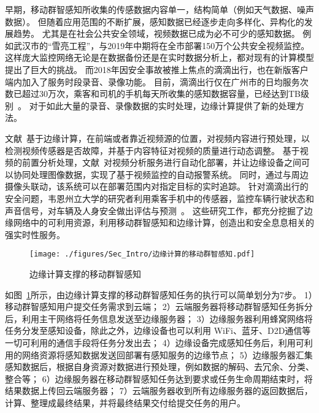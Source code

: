 

早期，移动群智感知所收集的传感数据内容单一，结构简单（例如天气数据、噪声数据）。
但随着应用范围的不断扩展，感知数据已经逐步走向多样化、异构化的发展趋势。
尤其是在社会公共安全领域，视频数据已成为必不可少的感知数据。
例如武汉市的“雪亮工程”，与2019年中期将在全市部署150万个公共安全视频监控。
这样庞大监控网络无论是在数据备份还是在实时数据分析上，都对现有的计算模型提出了巨大的挑战。
而2018年因安全事故被推上焦点的滴滴出行，也在新版客户端内加入了服务时段录音、录像功能。
目前，滴滴出行仅在广州市的日均服务次数已超过30万次，乘客和司机的手机每天所收集的感知数据容量，已经达到TB级别~\cite{DBLP:conf/aaai/Yao0KTJLGYL18}。
对于如此大量的录音、录像数据的实时处理，边缘计算提供了新的处理方法。

文献~\cite{DBLP:conf/edge/SunLS17}基于边缘计算，在前端或者靠近视频源的位置，对视频内容进行预处理，以检测视频传感器是否故障，并基于内容特征对视频的质量进行动态调整。
基于视频的前置分析处理，文献~\cite{DBLP:journals/iotj/ZhangZSZ18}对视频分析服务进行自动化部署，并让边缘设备之间可以协同处理图像数据，实现了基于视频监控的自动报警系统。
同时，通过与周边摄像头联动，该系统可以在部署范围内对指定目标的实时追踪。
针对滴滴出行的安全问题，韦恩州立大学的研究者利用乘客手机中的传感器，监控车辆行驶状态和声音信号，对车辆及人身安全做出评估与预测~\cite{DBLP:conf/edge/LiuZQS18}。
这些研究工作，都充分挖掘了边缘网络中的可利用资源，利用移动群智感知和边缘计算，创造出和安全息息相关的强实时性服务。

\begin{figure}[!b]
  \centering
  \vspace{-1em}
  \texttt{[image: ./figures/Sec\_Intro/边缘计算的移动群智感知.pdf]}
  \vspace{-0.5em}
  \caption{边缘计算支撑的移动群智感知}
  \vspace{-1em}
  \label{Figure_MCS_with_EC}
\end{figure}

如图~\ref{Figure_MCS_with_EC}所示，由边缘计算支撑的移动群智感知任务的执行可以简单划分为7步。
1）移动群智感知用户提交任务需求到云端；
2）云端服务器将移动群智感知任务拆分后，利用主干网络将任务信息发送至边缘服务器；
3）边缘服务器利用蜂窝网络将任务分发至感知设备，除此之外，边缘设备也可以利用 WiFi、蓝牙、D2D通信等一切可利用的通信手段将任务分发出去；
4）边缘设备完成感知任务后，利用可利用的网络资源将感知数据发送回部署有感知服务的边缘节点；
5）边缘服务器汇集感知数据后，根据自身资源对数据进行预处理，例如数据的解码、去冗余、分类、整合等；
6）边缘服务器在移动群智感知任务达到要求或任务生命周期结束时，将结果数据上传回云端服务器；
7）云端服务器收到所有边缘服务器的返回数据后，计算、整理成最终结果，并将最终结果交付给提交任务的用户。

